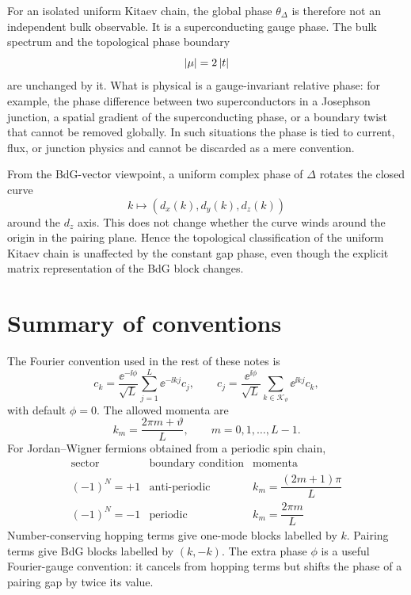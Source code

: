 For an isolated uniform Kitaev chain, the global phase $\theta_\Delta$ is therefore
not an independent bulk observable.  It is a superconducting gauge phase.  The
bulk spectrum and the topological phase boundary
\begin{equation}
    \left|\mu\right|=2\left|t\right|
\end{equation}
are unchanged by it.  What is physical is a gauge-invariant relative phase: for
example, the phase difference between two superconductors in a Josephson junction,
a spatial gradient of the superconducting phase, or a boundary twist that cannot
be removed globally.  In such situations the phase is tied to current, flux, or
junction physics and cannot be discarded as a mere convention.

From the BdG-vector viewpoint, a uniform complex phase of $\Delta$ rotates the
closed curve
\begin{equation}
    k\mapsto (d_x(k),d_y(k),d_z(k))
\end{equation}
around the $d_z$ axis.  This does not change whether the curve winds around the
origin in the pairing plane.  Hence the topological classification of the uniform
Kitaev chain is unaffected by the constant gap phase, even though the explicit
matrix representation of the BdG block changes.

\section{Summary of conventions}

The Fourier convention used in the rest of these notes is
\begin{equation}
    c_k
    =
    \frac{\ee^{-\ii\phi}}{\sqrt{L}}
    \sum_{j=1}^{L}\ee^{-\ii k j}c_j,
    \qquad
    c_j
    =
    \frac{\ee^{\ii\phi}}{\sqrt{L}}
    \sum_{k\in\mathcal{K}_\vartheta}\ee^{\ii k j}c_k,
\end{equation}
with default $\phi=0$.  The allowed momenta are
\begin{equation}
    k_m=\frac{2\pi m+\vartheta}{L},
    \qquad
    m=0,1,\ldots,L-1.
\end{equation}
For Jordan--Wigner fermions obtained from a periodic spin chain,
\begin{equation}
\begin{array}{c|c|c}
    \text{sector} & \text{boundary condition} & \text{momenta} \\
    \hline
    (-1)^N=+1 & \text{anti-periodic} & k_m=\dfrac{(2m+1)\pi}{L} \\
    (-1)^N=-1 & \text{periodic} & k_m=\dfrac{2\pi m}{L}
\end{array}
\end{equation}
Number-conserving hopping terms give one-mode blocks labelled by $k$.  Pairing
terms give BdG blocks labelled by $(k,-k)$.  The extra phase $\phi$ is a useful
Fourier-gauge convention: it cancels from hopping terms but shifts the phase of a
pairing gap by twice its value.
